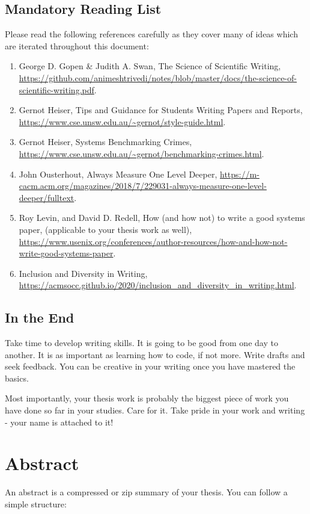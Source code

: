 \documentclass{article}
\begin{document}
\subsection*{Mandatory Reading List}
Please read the following references carefully as they cover many of ideas which are iterated throughout this document:  
\begin{enumerate}
    \item George D. Gopen \& Judith A. Swan, The Science of Scientific Writing, \url{https://github.com/animeshtrivedi/notes/blob/master/docs/the-science-of-scientific-writing.pdf}. 
    \item Gernot Heiser, Tips and Guidance for Students Writing Papers and Reports, \url{https://www.cse.unsw.edu.au/~gernot/style-guide.html}. 
    \item Gernot Heiser, Systems Benchmarking Crimes, \url{https://www.cse.unsw.edu.au/~gernot/benchmarking-crimes.html}. 
    \item John Ousterhout, Always Measure One Level Deeper, \url{https://m-cacm.acm.org/magazines/2018/7/229031-always-measure-one-level-deeper/fulltext}. 
    \item Roy Levin, and David D. Redell,  How (and how not) to write a good systems paper, (applicable to your thesis work as well), \url{https://www.usenix.org/conferences/author-resources/how-and-how-not-write-good-systems-paper}.
    \item Inclusion and Diversity in Writing, \url{https://acmsocc.github.io/2020/inclusion_and_diversity_in_writing.html}. 
\end{enumerate}
\subsection*{In the End}
Take time to develop writing skills. It is going to be good from one day to another. It is as important as learning how to code, if not more. Write drafts and seek feedback. You can be creative in your writing once you have mastered the basics. 

Most importantly, your thesis work is probably the biggest piece of work you have done so far in your studies. Care for it. Take pride in your work and writing - your name is attached to it! 

\newpage
\section{Abstract}
An abstract is a compressed or zip summary of your thesis. You can follow a simple structure:
\end{document}
